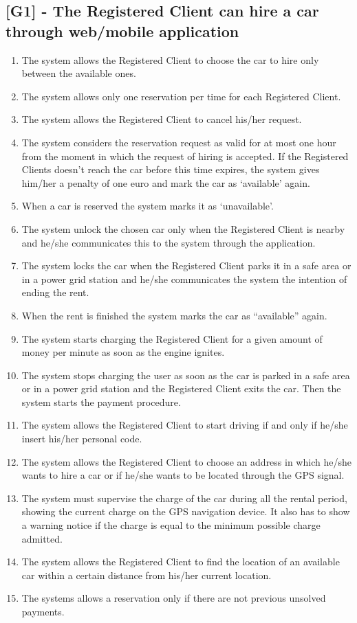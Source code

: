 \subsection{[G1] - The Registered Client can hire a car through web/mobile application}
\begin{enumerate}[label=\textbf{R1.\arabic*)}]
\item The system allows the Registered Client to choose the car to hire only between the available ones.
\item The system allows only one reservation per time for each Registered Client.
\item The system allows the Registered Client to cancel his/her request.
\item The system considers the reservation request as valid for at most one hour from the moment in which the request of hiring is accepted.
If the Registered Clients doesn’t reach the car before this time expires, the system gives him/her a penalty of one euro and mark the car as ‘available’ again.
\item When a car is reserved the system marks it as ‘unavailable’.
\item The system unlock the chosen car only when the Registered Client is nearby and he/she communicates this to the system through the application.
\item The system locks the car when the Registered Client parks it in a safe area or in a power grid station and he/she communicates the system the intention of ending the rent.
\item When the rent is finished the system marks the car as “available” again.
\item The system starts charging the Registered Client for a given amount of money per minute as soon as the engine ignites.
\item The system stops charging the user as soon as the car is parked in a safe area or in a power grid station and the Registered Client exits the car.
Then the system starts the payment procedure.
\item The system allows the Registered Client to start driving if and only if he/she insert his/her personal code.
\item The system allows the Registered Client to choose an address in which he/she wants to hire a car or if he/she wants to be located through the GPS signal.
\item The system must supervise the charge of the car during all the rental period, showing the current charge on the GPS navigation device.
It also has to show a warning notice if the charge is equal to the minimum possible charge admitted.
\item The system allows the Registered Client to find the location of an available car within a certain distance from his/her current location.
\item The systems allows a reservation only if there are not previous unsolved payments.
\end{enumerate}

